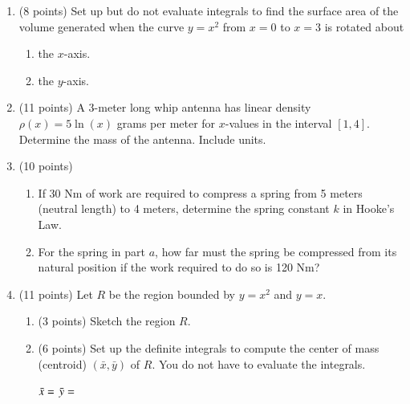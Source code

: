 \documentclass[12pt]{article}
\let\ds\displaystyle
\begin{document}
\begin{enumerate}
\item (8 points) Set up but do not evaluate integrals to find the surface area of the volume generated when the curve  $y=x^2$ from $x=0$ to $x=3$ is rotated about 
	\begin{enumerate}
	\item the $x$-axis.
	\vfill
	\item the $y$-axis.
	\vfill
	\end{enumerate}	
\item (11 points) A 3-meter long whip antenna has linear density $\ds \rho(x) =
  5\ln(x)$ grams per meter for $x$-values in the interval $[1,4].$ Determine
  the mass of the antenna. Include units.  
  
\vfill

\vfill
 \newpage 
 \item (10 points) 
 	\begin{enumerate}
	\item If 30 Nm of work are required to compress a spring from 5 meters (neutral length) to 4 meters, determine the spring constant $k$ in Hooke's Law.
	\vfill
	\item For the spring in part $a$, how far must the spring be compressed from its natural position if the work required to do so is 120 Nm?\\
 	\vfill
 	\end{enumerate}
 
\newpage
 \item (11 points) Let $R$ be the  region bounded by $y=x^2$ and $y=x$.
	\begin{enumerate}
	\item (3 points) Sketch the region $R.$
	\vfill
	\item (6 points) Set up the definite integrals to compute the center of mass (centroid) $(\bar{x}, \bar{y})$ of $R.$ You do not have to evaluate the integrals.\\
	
	\vspace{.5in}
	
	${\Large{\bar{x}}}= $ \quad \hspace{3in} ${\Large{\bar{y}}}= $\\
	
	\vspace*{-.75in}
	\quad \hspace{1cm}\framebox[60mm]{\rule{0pt}{40mm}} \hspace{1in}\framebox[60mm]{\rule{0pt}{40mm}}
	

\end{enumerate}
\end{enumerate}
\end{document}
